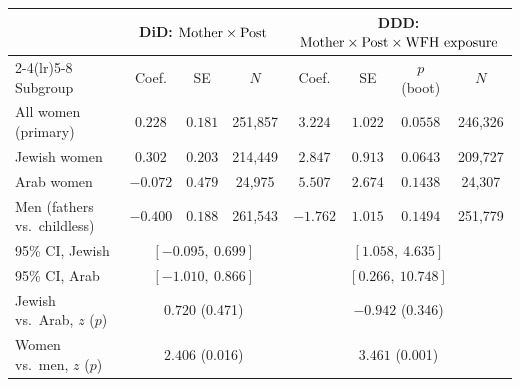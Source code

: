 \begin{tabular}{lccccccc}
\toprule
 & \multicolumn{3}{c}{DiD: $\text{Mother} \times \text{Post}$} & \multicolumn{4}{c}{DDD: $\text{Mother} \times \text{Post} \times \text{WFH exposure}$} \\
\cmidrule(lr){2-4}\cmidrule(lr){5-8}
Subgroup & Coef. & SE & $N$ & Coef. & SE & $p$ (boot) & $N$ \\
\midrule
All women (primary) & $0.228$ & $0.181$ & 251{,}857 & $3.224$\sym{**} & $1.022$ & $0.0558$ & 246{,}326 \\
Jewish women & $0.302$ & $0.203$ & 214{,}449 & $2.847$\sym{**} & $0.913$ & $0.0643$ & 209{,}727 \\
Arab women & $-0.072$ & $0.479$ & 24{,}975 & $5.507$\sym{*} & $2.674$ & $0.1438$ & 24{,}307 \\
Men (fathers vs.\ childless) & $-0.400$\sym{*} & $0.188$ & 261{,}543 & $-1.762$\sym{\cdot} & $1.015$ & $0.1494$ & 251{,}779 \\
\midrule
95\% CI, Jewish & \multicolumn{3}{c}{$[-0.095,\ 0.699]$} & \multicolumn{4}{c}{$[1.058,\ 4.635]$} \\
95\% CI, Arab & \multicolumn{3}{c}{$[-1.010,\ 0.866]$} & \multicolumn{4}{c}{$[0.266,\ 10.748]$} \\
Jewish vs.\ Arab, $z$ ($p$) & \multicolumn{3}{c}{$0.720$ (0.471)} & \multicolumn{4}{c}{$-0.942$ (0.346)} \\
Women vs.\ men, $z$ ($p$) & \multicolumn{3}{c}{$2.406$ (0.016)} & \multicolumn{4}{c}{$3.461$ (0.001)} \\
\bottomrule
\end{tabular}
